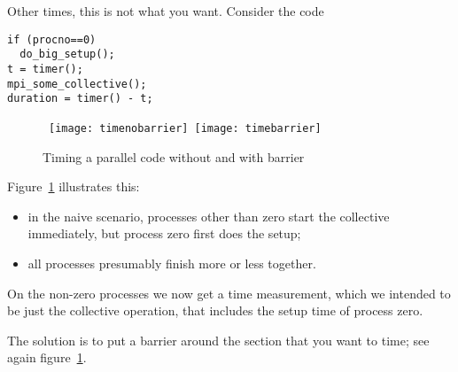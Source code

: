 Other times, this is not what you want.
Consider the code
\begin{lstlisting}
if (procno==0)
  do_big_setup();
t = timer();
mpi_some_collective();
duration = timer() - t;
\end{lstlisting}

\begin{figure}[ht]
  \hbox\bgroup
  \texttt{[image: timenobarrier]}
  \texttt{[image: timebarrier]}
  \egroup
  \caption{Timing a parallel code without and with barrier}
  \label{fig:time-collective}
\end{figure}

Figure~\ref{fig:time-collective} illustrates this:
\begin{itemize}
\item in the naive scenario, processes other than zero start the collective immediately,
  but process zero first does the setup;
\item all processes presumably finish more or less together.
\end{itemize}
On the non-zero processes we now get a time measurement,
which we intended to be just the collective operation,
that includes the setup time of process zero.

The solution is to put a barrier around the section that you want to time;
see again figure~\ref{fig:time-collective}.


